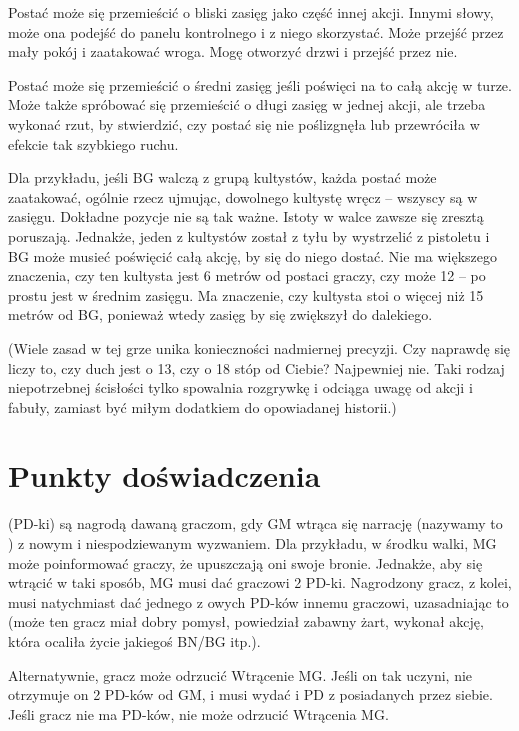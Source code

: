 Postać może się przemieścić o bliski zasięg jako część innej akcji. Innymi słowy, może ona podejść do panelu kontrolnego i z niego skorzystać. Może przejść przez mały pokój i zaatakować wroga. Mogę otworzyć drzwi i przejść przez nie.

Postać może się przemieścić o średni zasięg jeśli poświęci na to całą akcję w turze. Może także spróbować się przemieścić o długi zasięg w jednej akcji, ale trzeba wykonać rzut, by stwierdzić, czy postać się nie poślizgnęła lub  przewróciła w efekcie tak szybkiego ruchu.

Dla przykładu, jeśli BG walczą z grupą kultystów, każda postać może zaatakować, ogólnie rzecz ujmując, dowolnego kultystę wręcz – wszyscy są w zasięgu. Dokładne pozycje nie są tak ważne. Istoty w walce zawsze się zresztą poruszają. Jednakże, jeden z kultystów został z tyłu by wystrzelić z pistoletu i BG może musieć poświęcić całą akcję, by się do niego dostać. Nie ma większego znaczenia, czy ten kultysta jest 6 metrów od postaci graczy, czy może 12 – po prostu jest w średnim zasięgu. Ma znaczenie, czy kultysta stoi o więcej niż 15 metrów od BG, ponieważ wtedy zasięg by się zwiększył do dalekiego.

(Wiele zasad w tej grze unika konieczności nadmiernej precyzji. Czy naprawdę się liczy to, czy duch jest o 13, czy o 18 stóp od Ciebie? Najpewniej nie. Taki rodzaj niepotrzebnej ścisłości tylko spowalnia rozgrywkę i odciąga uwagę od akcji i fabuły, zamiast być miłym dodatkiem do opowiadanej historii.)

\section {Punkty doświadczenia}

 (PD-ki) są nagrodą dawaną graczom, gdy GM wtrąca się narrację (nazywamy to ) z nowym i niespodziewanym wyzwaniem. Dla przykładu, w środku walki, MG może poinformować graczy, że upuszczają oni swoje bronie. Jednakże, aby się wtrącić w taki sposób, MG musi dać graczowi 2 PD-ki. Nagrodzony gracz, z kolei, musi natychmiast dać jednego z owych PD-ków innemu graczowi, uzasadniając to (może ten gracz miał dobry pomysł, powiedział zabawny żart, wykonał akcję, która ocaliła życie jakiegoś BN/BG itp.).

Alternatywnie, gracz może odrzucić Wtrącenie MG. Jeśli on tak uczyni, nie otrzymuje on 2 PD-ków od GM, i musi wydać i PD z posiadanych przez siebie. Jeśli gracz nie ma PD-ków, nie może odrzucić Wtrącenia MG.

